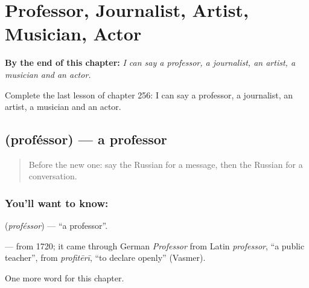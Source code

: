 
\chapter{Professor, Journalist, Artist, Musician, Actor}
\label{ch:ru-professor-journalist-artist-musician-actor}

\begin{chapteropening}
\textbf{By the end of this chapter:} \emph{I can say a professor, a journalist, an artist, a musician and an actor.}

Complete the last lesson of chapter 256: I can say a professor, a journalist, an artist, a musician and an actor.
\end{chapteropening}

\section[\texorpdfstring{\ru{профессор} (proféssor)}{профессор (proféssor)}]{ (proféssor) — a professor}

\label{lesson:RU-C256-professor}



\begin{quote}
Before the new one: say the Russian for a message, then the Russian for a conversation.
\end{quote}

\subsection*{You'll want to know: }
\textbf{} (\emph{proféssor}) — \textquotedblleft{}a professor\textquotedblright{}.

\begin{cousinweb}
\textbf{} — from 1720; it came through German \emph{Professor} from Latin \emph{professor}, \textquotedblleft{}a public teacher\textquotedblright{}, from \emph{profitērī}, \textquotedblleft{}to declare openly\textquotedblright{} (Vasmer).
\end{cousinweb}

\begin{grammarlens}[title={What you've built}]
One more word for this chapter.
\end{grammarlens}

